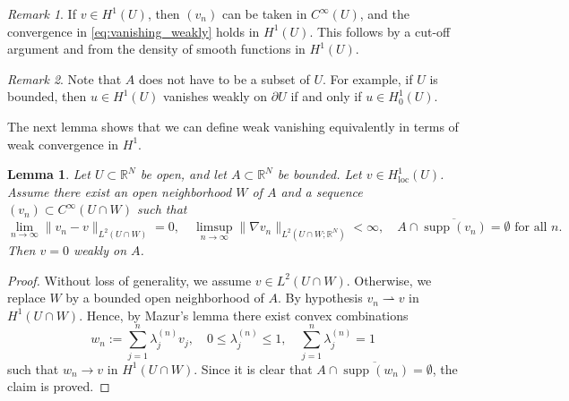 \documentclass{article}
\numberwithin{equation}{section}
\newtheorem{lemma}[theorem]{Lemma}
\theoremstyle{definition}
\theoremstyle{remark}
\newtheorem{remark}{Remark}[theorem]
\newcommand{\supp}{\operatorname{supp}}
\begin{document}
\begin{remark} \label{rmk:global_approximation}
    If $v \in H^1(U)$, then $(v_n)$ can be taken in $C^\infty(U)$, and the convergence in \eqref{eq:vanishing_weakly} holds in $H^1(U)$. This follows by a cut-off argument and from the density of smooth functions in $H^1(U)$.
\end{remark}

\begin{remark} \label{rmk:vanishing_weakly_on_boundary}
    Note that $A$ does not have to be a subset of $U$. For example, if $U$ is bounded, then $u \in H^1(U)$ vanishes weakly on $\partial U$ if and only if $u \in H_0^1(U)$.
\end{remark}

The next lemma shows that we can define weak vanishing equivalently in terms of weak convergence in $H^1$.

\begin{lemma} \label{lm:vanishing_weakly}
    Let $U \subset \mathbb{R}^N$ be open, and let $A \subset \mathbb{R}^N$ be bounded. Let $v \in H_\mathrm{loc}^1(U)$. Assume there exist an open neighborhood $W$ of $A$ and a sequence $(v_n) \subset C^\infty(U \cap W)$ such that
    \[
    \lim_{n \to \infty} \|v_n - v\|_{L^2(U \cap W)} = 0, \quad \limsup_{n \to \infty} \|\nabla v_n\|_{L^2(U \cap W; \mathbb{R}^N)} < \infty, \quad A \cap \overline{\supp (v_n)} = \emptyset \text{ for all } n.
    \]
    Then $v = 0$ weakly on $A$.
\end{lemma}

\begin{proof}
    Without loss of generality, we assume $v \in L^2(U \cap W)$. Otherwise, we replace $W$ by a bounded open neighborhood of $A$. By hypothesis $v_n \rightharpoonup v$ in $H^1(U \cap W)$. Hence, by Mazur's lemma there exist convex combinations
    \[
    w_n := \sum_{j = 1}^n \lambda_j^{(n)} v_j, \quad 0 \le \lambda_j^{(n)} \le 1, \quad \sum_{j = 1}^n \lambda_j^{(n)} = 1
    \]
    such that $w_n \to v$ in $H^1(U \cap W)$. Since it is clear that $A \cap \overline{\supp (w_n)} = \emptyset$, the claim is proved.
\end{proof}
\end{document}

